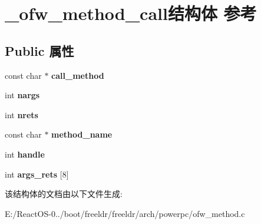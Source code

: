 \hypertarget{struct__ofw__method__call}{}\section{\+\_\+ofw\+\_\+method\+\_\+call结构体 参考}
\label{struct__ofw__method__call}
\subsection*{Public 属性}
\begin{DoxyCompactItemize}
\item 
\mbox{\label{struct__ofw__method__call_a0630a43c82339f5b5f2df3593190cba7}} 
const char $\ast$ {\bfseries call\+\_\+method}
\item 
\mbox{\label{struct__ofw__method__call_a76b8b15b46fc35aeaac22b77edcaab66}} 
int {\bfseries nargs}
\item 
\mbox{\label{struct__ofw__method__call_af042e98d128c880b2d7ffd8456f51183}} 
int {\bfseries nrets}
\item 
\mbox{\label{struct__ofw__method__call_ac374ffe33098060ac9f035a091d57b89}} 
const char $\ast$ {\bfseries method\+\_\+name}
\item 
\mbox{\label{struct__ofw__method__call_a22c5ced7cbf7e58b9bc8a7a8bce8b9db}} 
int {\bfseries handle}
\item 
\mbox{\label{struct__ofw__method__call_a395bcf27765337fc3314f003614f4023}} 
int {\bfseries args\+\_\+rets} \mbox{[}8\mbox{]}
\end{DoxyCompactItemize}


该结构体的文档由以下文件生成\+:\begin{DoxyCompactItemize}
\item 
E\+:/\+React\+O\+S-\/0../boot/freeldr/freeldr/arch/powerpc/ofw\+\_\+method.\+c\end{DoxyCompactItemize}
